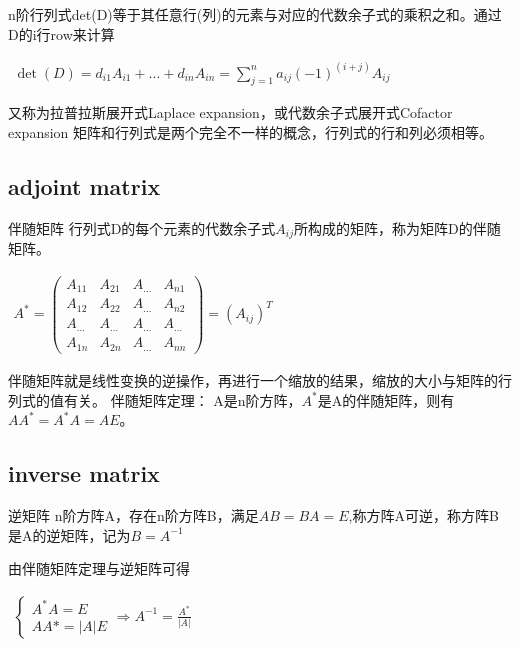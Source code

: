 n阶行列式det(D)等于其任意行(列)的元素与对应的代数余子式的乘积之和。通过D的i行row来计算

\begin{math}
    \begin{aligned}
   \det(D)=d_{i1}A_{i1}+...+d_{in}A_{in}=\sum_{j=1}^{n}{a_{ij}(-1)^{(i+j)}A_{ij}}
    \end{aligned}
\end{math}

又称为拉普拉斯展开式Laplace expansion，或代数余子式展开式Cofactor expansion
矩阵和行列式是两个完全不一样的概念，行列式的行和列必须相等。

\subsection{adjoint matrix}
伴随矩阵
行列式D的每个元素的代数余子式$A_{ij}$所构成的矩阵，称为矩阵D的伴随矩阵。

\begin{math}
    \begin{aligned}
A^{*}= \begin{pmatrix} A_{11}&A_{21}&A_{...}&A_{n1} \\
A_{12}&A_{22}&A_{...}&A_{n2} \\
A_{...}&A_{...}&A_{...}&A_{...} \\
A_{1n}&A_{2n}&A_{...}&A_{nn} \end{pmatrix} = (A_{ij})^T
\end{aligned}
\end{math}

伴随矩阵就是线性变换的逆操作，再进行一个缩放的结果，缩放的大小与矩阵的行列式的值有关。
伴随矩阵定理：
A是n阶方阵，$A^*$是A的伴随矩阵，则有$AA^*=A^*A=AE$。

\subsection{inverse matrix}
逆矩阵
n阶方阵A，存在n阶方阵B，满足$AB=BA=E$,称方阵A可逆，称方阵B是A的逆矩阵，记为$B=A^{-1}$

由伴随矩阵定理与逆矩阵可得

\begin{math}
    \begin{aligned}
\begin{cases} A^*A=E\\ AA*=|A|E \end{cases} \Rightarrow A^{-1}=\frac{A^*}{|A|}
\end{aligned}
\end{math}



